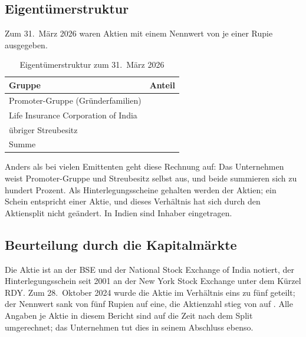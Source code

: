 \subsection{Eigent\"umerstruktur}

Zum 31.~M\"arz 2026 waren \Stueck{\RdyAktienAusgegeben} Aktien mit einem
Nennwert von je einer Rupie ausgegeben.

\begin{table}[htbp]
\centering
\caption{Eigent\"umerstruktur zum 31.~M\"arz 2026}
\label{tab:rdy-eigentuemer}
\begin{tabular}{lr}
\toprule
Gruppe & Anteil\\
\midrule
Promoter-Gruppe (Gr\"underfamilien)        & \Pct{\RdyPromoterAnteil}\\
Life Insurance Corporation of India        & \Pct{\RdyLicAnteil}\\
\"ubriger Streubesitz                       & \Pct{\RdyStreubesitzOhneLic}\\
\midrule
Summe                                       & \Pct{\RdySumme}\\
\bottomrule
\end{tabular}
\end{table}

Anders als bei vielen Emittenten geht diese Rechnung auf: Das Unternehmen
weist Promoter-Gruppe und Streubesitz selbst aus, und beide summieren sich zu
hundert Prozent.
Als Hinterlegungsscheine gehalten werden \Pct{\RdyAdrAnteil} der Aktien; ein
Schein entspricht einer Aktie, und dieses Verh\"altnis hat sich durch den
Aktiensplit nicht ge\"andert.
In Indien sind \Stueck{\RdyRecordHolder} Inhaber eingetragen.

\subsection{Beurteilung durch die Kapitalm\"arkte}

Die Aktie ist an der BSE und der National Stock Exchange of India notiert, der
Hinterlegungsschein seit 2001 an der New York Stock Exchange unter dem
K\"urzel RDY.
Zum 28.~Oktober 2024 wurde die Aktie im Verh\"altnis eins zu f\"unf geteilt;
der Nennwert sank von f\"unf Rupien auf eine, die Aktienzahl stieg von
\Stueck{\RdyAktienVorSplit} auf \Stueck{\RdyAktienNachSplit}.
Alle Angaben je Aktie in diesem Bericht sind auf die Zeit nach dem Split
umgerechnet; das Unternehmen tut dies in seinem Abschluss
ebenso.

